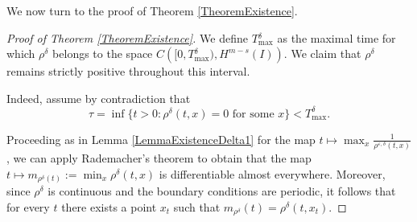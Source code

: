 \documentclass[12pt]{amsart}
\begin{document}
We now turn to the proof of Theorem \ref{TheoremExistence}. 
\begin{proof}[Proof of Theorem \ref{TheoremExistence}]

We define $T{_{\max}^\delta}$ as the maximal time for which $\rho^\delta$ belongs to the space $C([0, T{_{\max}^\delta)}, H^{m-s}(I))$. We claim that $\rho^\delta$ remains strictly positive throughout this interval.

		
	Indeed, assume by contradiction that
$$
\tau = \inf\{ t > 0 : \rho^{\delta}(t,x) = 0 \text{ for some } x \} < T_{\max}^\delta.
$$


Proceeding as in Lemma \ref{LemmaExistenceDelta1} for the map $t \mapsto \max_{x} \frac{1}{\rho^{\varepsilon,\delta}(t,x)}$, we can apply Rademacher's theorem to obtain that the map $t \mapsto m_{\rho^{\delta}(t)} := \min_x \rho^{\delta}(t,x)$ is differentiable almost everywhere. Moreover, since $\rho^{\delta}$ is continuous and the boundary conditions are periodic, it follows that for every $t$ there exists a point $x_t$ such that $m_{\rho^\delta}(t) = \rho^\delta(t, x_t)$.


\end{proof}
\end{document}
